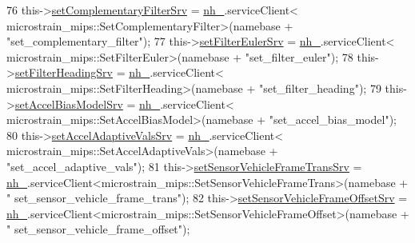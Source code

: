 \begin{DoxyCode}
76                 this->\hyperlink{classcl__microstrain__mips_1_1ClMicrostainMips_a54045931a06f909418ac284235c5dd5a}{setComplementaryFilterSrv} = \hyperlink{classcl__microstrain__mips_1_1ClMicrostainMips_a5a39ba0864ba2c4c003b6ea427538243}{nh\_}.serviceClient<
      microstrain\_mips::SetComplementaryFilter>(namebase + \textcolor{stringliteral}{"set\_complementary\_filter"});
77                 this->\hyperlink{classcl__microstrain__mips_1_1ClMicrostainMips_a4e88ebd03c7a774e958f8902c18e7f69}{setFilterEulerSrv} = \hyperlink{classcl__microstrain__mips_1_1ClMicrostainMips_a5a39ba0864ba2c4c003b6ea427538243}{nh\_}.serviceClient<
      microstrain\_mips::SetFilterEuler>(namebase + \textcolor{stringliteral}{"set\_filter\_euler"});
78                 this->\hyperlink{classcl__microstrain__mips_1_1ClMicrostainMips_abe64faba505dfdab0b78b7cf31f9609d}{setFilterHeadingSrv} = \hyperlink{classcl__microstrain__mips_1_1ClMicrostainMips_a5a39ba0864ba2c4c003b6ea427538243}{nh\_}.serviceClient<
      microstrain\_mips::SetFilterHeading>(namebase + \textcolor{stringliteral}{"set\_filter\_heading"});
79                 this->\hyperlink{classcl__microstrain__mips_1_1ClMicrostainMips_a8d7c0f0a94dd6a25cac0130f8d9f55ff}{setAccelBiasModelSrv} = \hyperlink{classcl__microstrain__mips_1_1ClMicrostainMips_a5a39ba0864ba2c4c003b6ea427538243}{nh\_}.serviceClient<
      microstrain\_mips::SetAccelBiasModel>(namebase + \textcolor{stringliteral}{"set\_accel\_bias\_model"});
80                 this->\hyperlink{classcl__microstrain__mips_1_1ClMicrostainMips_a0e22727b68e51261aa65605f236419e6}{setAccelAdaptiveValsSrv} = \hyperlink{classcl__microstrain__mips_1_1ClMicrostainMips_a5a39ba0864ba2c4c003b6ea427538243}{nh\_}.serviceClient<
      microstrain\_mips::SetAccelAdaptiveVals>(namebase + \textcolor{stringliteral}{"set\_accel\_adaptive\_vals"});
81                 this->\hyperlink{classcl__microstrain__mips_1_1ClMicrostainMips_ac020b44e78addaa26beb44081d99f194}{setSensorVehicleFrameTransSrv} = 
      \hyperlink{classcl__microstrain__mips_1_1ClMicrostainMips_a5a39ba0864ba2c4c003b6ea427538243}{nh\_}.serviceClient<microstrain\_mips::SetSensorVehicleFrameTrans>(namebase + \textcolor{stringliteral}{"
      set\_sensor\_vehicle\_frame\_trans"});
82                 this->\hyperlink{classcl__microstrain__mips_1_1ClMicrostainMips_a977cce1917e12d96f614266baa4ae55d}{setSensorVehicleFrameOffsetSrv} = 
      \hyperlink{classcl__microstrain__mips_1_1ClMicrostainMips_a5a39ba0864ba2c4c003b6ea427538243}{nh\_}.serviceClient<microstrain\_mips::SetSensorVehicleFrameOffset>(namebase + \textcolor{stringliteral}{"
      set\_sensor\_vehicle\_frame\_offset"});

\end{DoxyCode}
